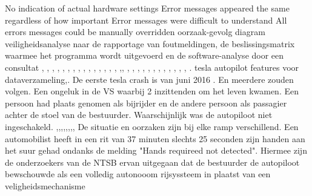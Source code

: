 No indication of actual hardware settings
Error messages appeared the same regardless of how important
Error messages were difficult to understand
All errors messages could be manually overridden
oorzaak-gevolg diagram
veiligheidsanalyse naar de rapportage van foutmeldingen, de beslissingsmatrix waarmee het programma wordt uitgevoerd en de software-analyse door een consultat
\cite{stackexchange2021therac25code}
\cite{rogaway2004therac25},
\cite{wikiTherac25}, 
\cite{lynch2017theracRaceConditions},	\cite{lim1998theracdisaster}, 
\cite{fabio26102015therac25},	 	\cite{ethicsunwrappedTherac25}, 	\cite{casesHistoryTherac25},	 	\cite{caballero2019Therac25}, 	\cite{rose1994theracFatalDose}, 	\cite{levesonMITTherac25},
\cite{grant1978theracevaluation},	 	\cite{turnerTheracAccidentsInvestigations},	\cite{turner1993TheracAccidentsInvestigations}, 	\cite{wang2017industrialdesignengineering}, 	\cite{levesonturner1993theracpart2},	\cite{porelloTheraccFailure},\cite{theracIncidents}, 
\cite{huffbrown2004casestudyethicatherac}, 
\cite{sebowikimedicalradiation},	\cite{hsia1995testtherac25},	\cite{magsilvaTheracTesting},
\cite{chemeuropetherac25},	\cite{statsenko10102016Therackillerbug},	\cite{therac25casestudy},	\cite{thomas1994theracinLotos},	\cite{twitter2019programmerbehindtherac},	\cite{wikibookstherac}, 
\cite{bozdagTherac25},	\cite{levesonTurnerTheracAbstract}, 	\cite{stackexchange2021therac25code}.
\newline \indent
tesla autopilot features voor dataverzameling\cite{denneyjdsupraFeds},\cite{gritti24062020tesladataengine}.
 De eerste tesla crash is van juni 2016 \cite{impakterTeslaCrash}. En meerdere zouden volgen.
Een ongeluk in  de VS waarbij 2 inzittenden om het leven kwamen. Een persoon had plaats genomen als bijrijder en de andere persoon als passagier achter de stoel van de bestuurder. Waarschijnlijk was de autopiloot niet ingeschakeld.
\cite{anderson30042021secondteslacrash},\cite{raynal20042021probeTeslaCrash},\cite{firstpress11052021fatalnonautopilot},\cite{cochran18042021nodriverTeslaCrash},\cite{gitlin11052021autopilot},\cite{sommerfield12072021NHTSAmandateresult},\cite{hawkins30062021nhtsarequiresreporting},\cite{wilson19042021teslacrashregulators},\cite{mcfarland22042021selfdrivingrisks}
De situatie en oorzaken zijn bij elke ramp verschillend. 
Een automobilist heeft in een rit van 37 minuten slechts 25 seconden zijn handen aan het suur gehad ondanks de melding "Hands requireed not detected". Hiermee zijn de onderzoekers van de NTSB ervan uitgegaan dat de bestuurder de autopiloot bewschouwde als een volledig autonooom rijsyssteem in plaatst van een veligheidsmechanisme
